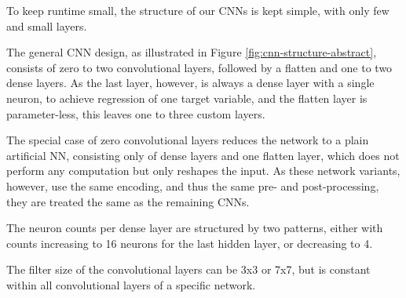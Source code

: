 To keep runtime small, the structure of our \glspl{CNN} is kept simple, with only few and small layers.

The general \gls{CNN} design, as illustrated in Figure \ref{fig:cnn-structure-abstract}, consists of zero to two convolutional layers, followed by a flatten and one to two dense layers. As the last layer, however, is always a dense layer with a single neuron, to achieve regression of one target variable, and the flatten layer is parameter-less, this leaves one to three custom layers. 

The special case of zero convolutional layers reduces the network to a plain artificial \gls{NN}, consisting only of dense layers and one flatten layer, which does not perform any computation but only reshapes the input. As these network variants, however, use the same encoding, and thus the same pre- and post-processing, they are treated the same as the remaining \glspl{CNN}.

The neuron counts per dense layer are structured by two patterns, either with counts increasing to 16 neurons for the last hidden layer, or decreasing to 4.

The filter size of the convolutional layers can be 3x3 or 7x7, but is constant within all convolutional layers of a specific network.

\pagebreak

